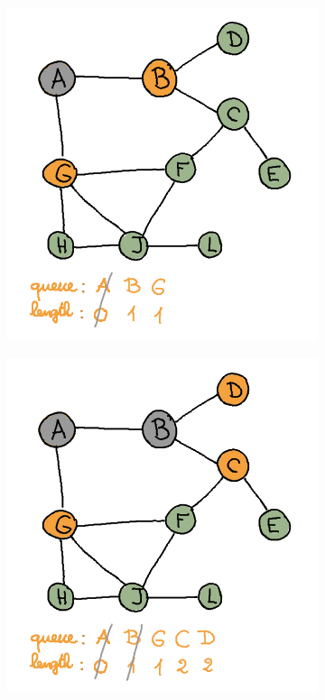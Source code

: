 \begin{enumerate}[(a)]
\begin{figure}[H]
\begin{subfigure}[h]{0.45\textwidth}
    \includegraphics[width=\textwidth]{Pictures/SP/panda_gebissen_1.png}
    \end{subfigure}
    \vspace{5mm}
    \centering
    \begin{subfigure}[h]{0.45\textwidth}
    \raggedright
    \includegraphics[width=\textwidth]{Pictures/SP/panda_gebissen_2.png}

\end{subfigure}
\end{figure}
\end{enumerate}
